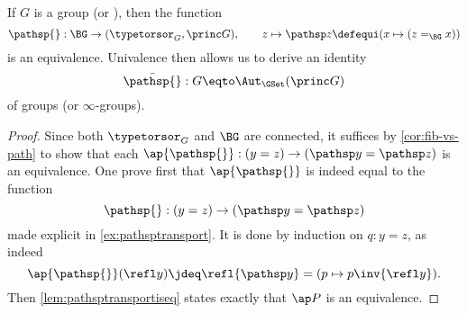 \begin{theorem}\label{lem:BGbytorsor}
  If $G$ is a group (or \inftygp), then the function
$$\pathsp{}:\BG\to(\typetorsor_G,\princ G),\qquad z\mapsto \pathsp z\defequi(x\mapsto(z=_{\BG}x))$$
is an equivalence.
Univalence then allows us to derive an identity
$$\bar{\pathsp{}}:G\eqto\Aut_{\GSet} (\princ G)$$
of groups (or $\infty$-groups).
\end{theorem}

\begin{proof}
  Since both $\typetorsor_G$ and $\BG$ are connected, it suffices by
  \cref{cor:fib-vs-path} to show that each
  $\ap {\pathsp{}}:(y=z)\to(\pathsp y=\pathsp z)$ is an
  equivalence. One prove first that $\ap {\pathsp{}}$ is indeed equal
  to the function
  $$\pathsp{}:(y=z)\to(\pathsp y= \pathsp z)$$
  made explicit in \cref{ex:pathsptransport}. It is done by induction
  on $q:y=z$, as indeed
  \begin{displaymath}
    \ap {\pathsp{}}(\refl y) \jdeq \refl {\pathsp y} = (p\mapsto p\inv{\refl y}).
  \end{displaymath}
  Then \cref{lem:pathsptransportiseq} states exactly that $\ap P$ is
  an equivalence.
\end{proof}

